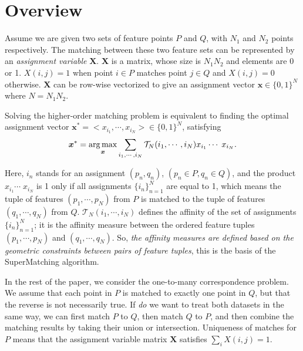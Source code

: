 \section{Overview}
\label{sec:overview}

Assume we are given two sets of feature points $P$ and $Q$, with $N_1$  and $N_2$ points respectively.
The matching between these two feature sets can be represented by an \emph{assignment variable} $\mathbf{X}$.
$\mathbf{X}$ is a matrix, whose size is $N_1N_2$ and elements are 0 or 1.
$X(i,j)=1$ when point $i \in P$ matches point $j \in Q$ and $X(i,j)=0$ otherwise. 
$\mathbf{X}$ can be row-wise vectorized to give an assignment vector $\boldsymbol{x} \in \{0,1\}^N$ where $N={N_1N_2}$.

Solving the higher-order matching problem is equivalent to finding the optimal assignment vector ${\boldsymbol{x}}^*=<x_{i_1},\cdots,x_{i_N}>
 \in \{0,1\}^{N}$, satisfying
\begin{equation}
\label{equ:assigment}
  {\boldsymbol{x}}^* = \operatorname*{arg\,max}_{\boldsymbol{x}}  \sum_{i_1,\cdots,i_N} \mathcal{T}_N(i_1,\cdots,i_N) x_{i_1}  \cdots\; x_{i_N}.
\end{equation}

Here, $i_n$ stands for an assignment $(p_n,q_n)$, $(p_n\in P, q_n\in Q)$, and the
product $x_{i_1}  \cdots\;x_{i_N}$ is 1 only if all assignments $\{i_n\}_{n=1}^N$ are equal to 1, 
which means the tuple of features $(p_1,\cdots,p_N)$ from $P$ is matched to the tuple of features $(q_1,\cdots,q_N)$ from $Q$.
$\mathcal{T}_N(i_1,\cdots,i_N)$ defines the affinity of the set of assignments $\{i_n\}_{n=1}^N$;
it is the affinity measure between the ordered feature tuples $(p_1,\cdots,p_N)$  and $(q_1,\cdots,q_N)$.
So, \emph{the affinity measures are defined based on the geometric constraints between pairs of feature tuples}, 
this is the basis of the SuperMatching algorithm.

In the rest of the paper, we consider the one-to-many correspondence problem.
We assume that each point in $P$ is matched to exactly one point in $Q$, but that the reverse is not necessarily true.
If \emph{do} we want to treat both datasets in the same way,
we can first match $P$ to $Q$, then match $Q$ to $P$, and then combine the matching results by taking their union or intersection.
Uniqueness of matches for $P$ means that the assignment variable matrix $\mathbf{X}$ satisfies $\sum\nolimits_i X(i,j)=1$.

